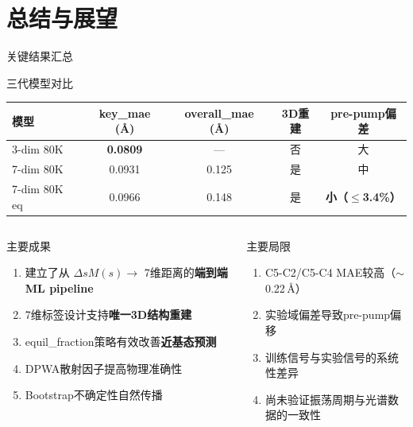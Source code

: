 \documentclass[aspectratio=169,9pt]{beamer}
\newcommand{\dsm}{\Delta sM}
\begin{document}
\section{总结与展望}

\begin{frame}{关键结果汇总}
  \begin{block}{三代模型对比}
    \scriptsize
    \renewcommand{\arraystretch}{1.1}
    \begin{tabular}{@{}lcccc@{}}
      \toprule
      \textbf{模型} & \textbf{key\_mae (\AA)} & \textbf{overall\_mae (\AA)} & \textbf{3D重建} & \textbf{pre-pump偏差} \\
      \midrule
      3-dim 80K & \textbf{0.0809} & --- & 否 & 大 \\
      7-dim 80K & 0.0931 & 0.125 & 是 & 中 \\
      7-dim 80K eq & 0.0966 & 0.148 & 是 & \textbf{小（$\leq$3.4\%）} \\
      \bottomrule
    \end{tabular}
  \end{block}

  \begin{columns}[T]
    \begin{exampleblock}{主要成果}
      \scriptsize
      \begin{enumerate}
        \item 建立了从 $\dsm(s) \to$ 7维距离的\textbf{端到端ML pipeline}
        \item 7维标签设计支持\textbf{唯一3D结构重建}
        \item equil\_fraction策略有效改善\textbf{近基态预测}
        \item DPWA散射因子提高物理准确性
        \item Bootstrap不确定性自然传播
      \end{enumerate}
    \end{exampleblock}

    \begin{alertblock}{主要局限}
      \scriptsize
      \begin{enumerate}
        \item C5-C2/C5-C4 MAE较高（$\sim$0.22\,\AA）
        \item 实验域偏差导致pre-pump偏移
        \item 训练信号与实验信号的系统性差异
        \item 尚未验证振荡周期与光谱数据的一致性
      \end{enumerate}
    \end{alertblock}
  \end{columns}
\end{frame}
\end{document}
